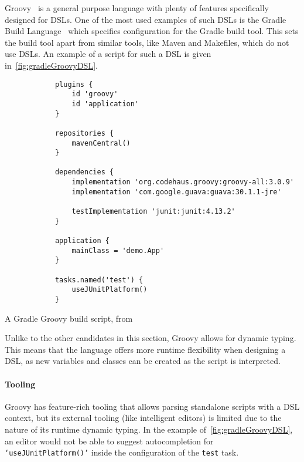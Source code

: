 Groovy~\cite{groovyLangIndex} is a general purpose language with plenty of features specifically designed for DSLs.
One of the most used examples of such DSLs is the Gradle Build Language~\cite{gradleDSL} which specifies configuration for the Gradle build tool.
This sets the build tool apart from similar tools, like Maven and Makefiles, which do not use DSLs.
An example of a script for such a DSL is given in~\autoref{fig:gradleGroovyDSL}.

\begin{listing}[h]
    \centering
    \begin{minipage}{0.8\textwidth}
        \begin{verbatim}
            plugins {
                id 'groovy'
                id 'application'
            }

            repositories {
                mavenCentral()
            }

            dependencies {
                implementation 'org.codehaus.groovy:groovy-all:3.0.9'
                implementation 'com.google.guava:guava:30.1.1-jre'

                testImplementation 'junit:junit:4.13.2'
            }

            application {
                mainClass = 'demo.App'
            }

            tasks.named('test') {
                useJUnitPlatform()
            }
        \end{verbatim}
    \end{minipage}
    \caption[Gradle Groovy Build script]
    {A Gradle Groovy build script, from~\cite{gradleDSL}}
    \label{fig:gradleGroovyDSL}
\end{listing}

Unlike to the other candidates in this section, Groovy allows for dynamic typing.
This means that the language offers more runtime flexibility when designing a DSL, as new variables and classes can be created as the script is interpreted.

\paragraph{Tooling} Groovy has feature-rich tooling that allows parsing standalone scripts with a DSL context, but its external tooling (like intelligent editors) is limited due to the nature of its runtime dynamic typing.
In the example of~\autoref{fig:gradleGroovyDSL}, an editor would not be able to suggest autocompletion for \texttt{`useJUnitPlatform()'} inside the configuration of the \texttt{test} task.

